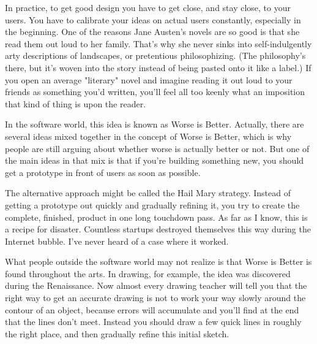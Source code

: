 In
                  practice, to get good design you have to get close, and stay
                  close, to your users. You have to calibrate your ideas on
                  actual users constantly, especially in the beginning. One of
                  the reasons Jane Austen's novels are so good is that she read
                  them out loud to her family. That's why she never sinks into
                  self-indulgently arty descriptions of landscapes, or
                  pretentious philosophizing. (The philosophy's there, but it's
                  woven into the story instead of being pasted onto it like a
                  label.) If you open an average "literary" novel and imagine
                  reading it out loud to your friends as something you'd
                  written, you'll feel all too keenly what an imposition that
                  kind of thing is upon the reader.

In the software
                  world, this idea is known as Worse is Better. Actually, there
                  are several ideas mixed together in the concept of Worse is
                  Better, which is why people are still arguing about whether
                  worse is actually better or not. But one of the main ideas in
                  that mix is that if you're building something new, you should
                  get a prototype in front of users as soon as possible.

The
                  alternative approach might be called the Hail Mary strategy.
                  Instead of getting a prototype out quickly and gradually
                  refining it, you try to create the complete, finished, product
                  in one long touchdown pass. As far as I know, this is a recipe
                  for disaster. Countless startups destroyed themselves this way
                  during the Internet bubble. I've never heard of a case where
                  it worked.

What people outside the software world
                  may not realize is that Worse is Better is found throughout
                  the arts. In drawing, for example, the idea was discovered
                  during the Renaissance. Now almost every drawing teacher will
                  tell you that the right way to get an accurate drawing is not
                  to work your way slowly around the contour of an object,
                  because errors will accumulate and you'll find at the end that
                  the lines don't meet. Instead you should draw a few quick
                  lines in roughly the right place, and then gradually refine
                  this initial sketch.

